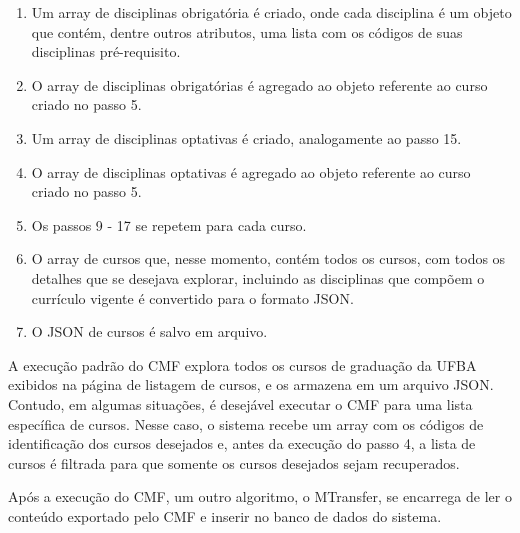 \begin{enumerate}
    \item Um array de disciplinas obrigatória é criado, onde cada disciplina é um objeto que contém, dentre outros atributos, uma lista com os códigos de suas disciplinas pré-requisito.
    \item O array de disciplinas obrigatórias é agregado ao objeto referente ao curso criado no passo 5.
    \item Um array de disciplinas optativas é criado, analogamente ao passo 15.
    \item O array de disciplinas optativas é agregado ao objeto referente ao curso criado no passo 5.
    \item Os passos 9 - 17 se repetem para cada curso.
    \item O array de cursos que, nesse momento, contém todos os cursos, com todos os detalhes que se desejava explorar, incluindo as disciplinas que compõem o currículo vigente é convertido para o formato JSON.
    \item O JSON de cursos é salvo em arquivo.
\end{enumerate}

A execução padrão do CMF explora todos os cursos de graduação da UFBA exibidos na página de listagem de cursos, e os armazena em um arquivo JSON. Contudo, em algumas situações, é desejável executar o CMF para uma lista específica de cursos. Nesse caso, o sistema recebe um array com os códigos de identificação dos cursos desejados e, antes da execução do passo 4, a lista de cursos é filtrada para que somente os cursos desejados sejam recuperados.

Após a execução do CMF, um outro algoritmo, o MTransfer, se encarrega de ler o conteúdo exportado pelo CMF e inserir no banco de dados do sistema.